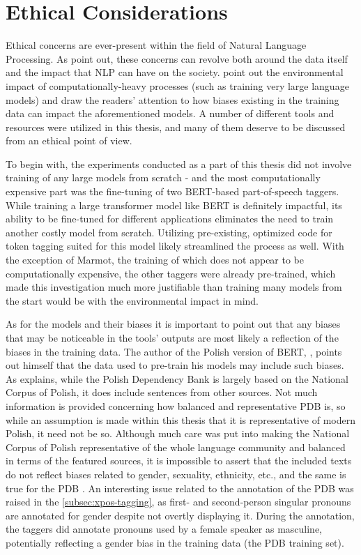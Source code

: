 \section{Ethical Considerations}
\label{sec:ethicalcons}

Ethical concerns are ever-present within the field of Natural Language Processing. As \citet{hovy-spruit-2016-social} point out, these concerns can revolve both around the data itself and the impact that NLP can have on the society. \citet{stochastic-parrots} point out the environmental impact of computationally-heavy processes (such as training very large language models) and draw the readers' attention to how biases existing in the training data can impact the aforementioned models. A number of different tools and resources were utilized in this thesis, and many of them deserve to be discussed from an ethical point of view.

To begin with, the experiments conducted as a part of this thesis did not involve training of any large models from scratch - and the most computationally expensive part was the fine-tuning of two BERT-based part-of-speech taggers. While training a large transformer model like BERT is definitely impactful, its ability to be fine-tuned for different applications eliminates the need to train another costly model from scratch. Utilizing pre-existing, optimized code for token tagging suited for this model likely streamlined the process as well. With the exception of Marmot, the training of which does not appear to be computationally expensive, the other taggers were already pre-trained, which made this investigation much more justifiable than training many models from the start would be with the environmental impact in mind. 

As for the models and their biases it is important to point out that any biases that may be noticeable in the tools' outputs are most likely a reflection of the biases in the training data. The author of the Polish version of BERT, \citet{kłeczek_2021}, points out himself that the data used to pre-train his models may include such biases. As \citet{wroblewska-2018-extended} explains, while the Polish Dependency Bank is largely based on the National Corpus of Polish, it does include sentences from other sources. Not much information is provided concerning how balanced and representative PDB is, so while an assumption is made within this thesis that it is representative of modern Polish, it need not be so. Although much care was put into making the National Corpus of Polish representative of the whole language community and balanced in terms of the featured sources, it is impossible to assert that the included texts do not reflect biases related to gender, sexuality, ethnicity, etc., and the same is true for the PDB \citep{nkjp}. An interesting issue related to the annotation of the PDB was raised in the \autoref{subsec:xpos-tagging}, as first- and second-person singular pronouns are annotated for gender despite not overtly displaying it. During the annotation, the taggers did annotate pronouns used by a female speaker as masculine, potentially reflecting a gender bias in the training data (the PDB training set). 

